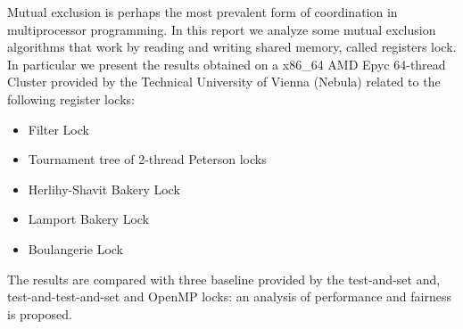 Mutual exclusion is perhaps the most prevalent form of coordination in multiprocessor programming. In this report we analyze some mutual exclusion algorithms that work by reading and writing shared memory, called registers lock. In particular we present the results obtained on a x86\_64 AMD Epyc 64-thread Cluster provided by the Technical University of Vienna (Nebula) related to the following register locks:

\begin{itemize}
	\item Filter Lock
	\item Tournament tree of 2-thread Peterson locks
	\item Herlihy-Shavit Bakery Lock
	\item Lamport Bakery Lock
	\item Boulangerie Lock
\end{itemize}

The results are compared with three baseline provided by the test-and-set and, test-and-test-and-set and OpenMP locks: an analysis of performance and fairness is proposed.
